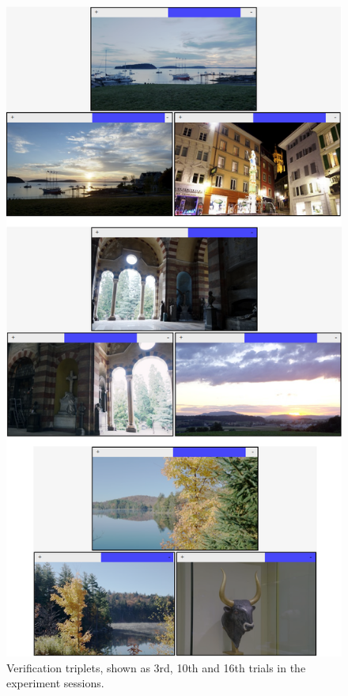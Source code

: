 \begin{figure}
\begin{center}
\includegraphics[height=0.85\textheight]{figures/chapter3/verification.png}
\caption{Verification triplets, shown as 3rd, 10th and 16th trials in the experiment sessions. }
\label{fig:verficiation}
\end{center}
\end{figure}

